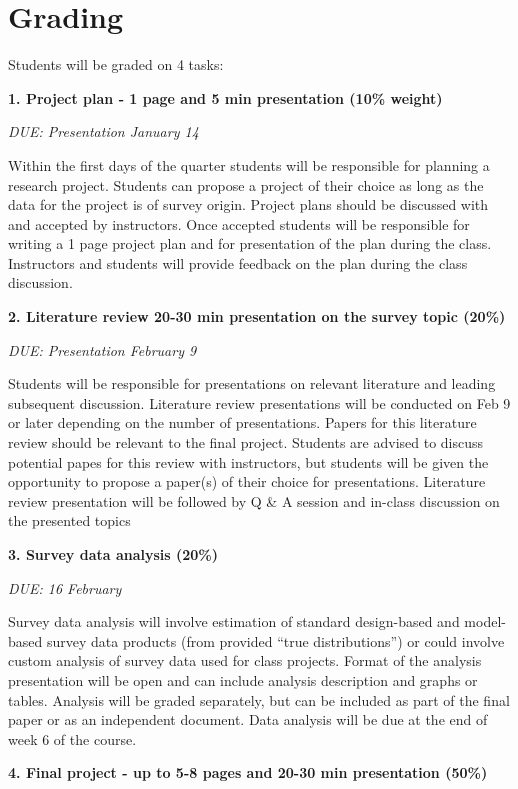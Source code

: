 \documentclass[
  letterpaper,
  oneside,
  open=any]{scrbook}
\begin{document}
\section{Grading}\label{grading}

Students will be graded on 4 tasks:

\textbf{1. Project plan - 1 page and 5 min presentation (10\% weight)}

\emph{DUE: Presentation January 14}

Within the first days of the quarter students will be responsible for
planning a research project. Students can propose a project of their
choice as long as the data for the project is of survey origin. Project
plans should be discussed with and accepted by instructors. Once
accepted students will be responsible for writing a 1 page project plan
and for presentation of the plan during the class. Instructors and
students will provide feedback on the plan during the class discussion.

\textbf{2. Literature review 20-30 min presentation on the survey topic
(20\%)}

\emph{DUE: Presentation February 9}

Students will be responsible for presentations on relevant literature
and leading subsequent discussion. Literature review presentations will
be conducted on Feb 9 or later depending on the number of presentations.
Papers for this literature review should be relevant to the final
project. Students are advised to discuss potential papes for this review
with instructors, but students will be given the opportunity to propose
a paper(s) of their choice for presentations. Literature review
presentation will be followed by Q \& A session and in-class discussion
on the presented topics

\textbf{3. Survey data analysis (20\%)}

\emph{DUE: 16 February}

Survey data analysis will involve estimation of standard design-based
and model-based survey data products (from provided ``true
distributions'') or could involve custom analysis of survey data used
for class projects. Format of the analysis presentation will be open and
can include analysis description and graphs or tables. Analysis will be
graded separately, but can be included as part of the final paper or as
an independent document. Data analysis will be due at the end of week 6
of the course.

\textbf{4. Final project - up to 5-8 pages and 20-30 min presentation
(50\%)}
\end{document}
